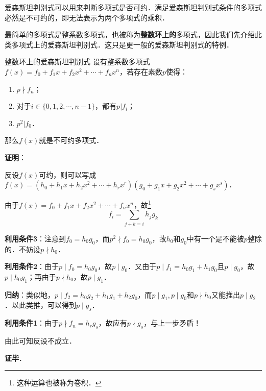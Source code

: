 
爱森斯坦判别式可以用来判断多项式是否可约．满足爱森斯坦判别式条件的多项式必然是不可约的，即无法表示为两个多项式的乘积．

最简单的多项式是整系数多项式，也被称为\textbf{整数环上的}多项式，因此我们先介绍此类多项式上的爱森斯坦判别式．这只是更一般的爱森斯坦判别式的特例．

\begin{theorem}{整数环上的爱森斯坦判别式}
设有整系数多项式$f(x)=f_0+f_1x+f_2x^2+\cdots+f_nx^n$，若存在素数$p$使得：
\begin{enumerate}
\item $p\nmid f_n$；
\item 对于$i\in\{0, 1, 2, \cdots, n-1\}$，都有$p|f_i$；
\item $p^2|f_0$．
\end{enumerate}
那么$f(x)$就是不可约多项式．
\end{theorem}

\textbf{证明}：

反设$f(x)$可约，则可以写成$f(x)=(h_0+h_1x+h_2x^2+\cdots+h_rx^r)(g_0+g_1x+g_2x^2+\cdots+g_sx^s)$．

由于$f(x)=f_0+f_1x+f_2x^2+\cdots+f_nx^n$，故\footnote{这种运算也被称为卷积．}\begin{equation}f_i=\sum\limits_{j+k=i}h_jg_k\end{equation}

\textbf{利用条件3}：注意到$f_0=h_0g_0$，而$p^2\nmid f_0=h_0g_0$，故$h_0$和$g_0$中有一个是不能被$p$整除的．不妨设$p\nmid h_0$．

\textbf{利用条件2}：由于$p\mid f_0=h_0g_0$，故$p\mid g_0$．又由于$p\mid f_1=h_0g_1+h_1g_0$且$p\mid g_0$，故$p\mid h_0g_1$；再由于$p\nmid h_0$，故$p\mid g_1$．

\textbf{归纳}：类似地，$p\mid f_2=h_0g_2+h_1g_1+h_2g_0$，而$p\mid g_1, p\mid g_0$和$p\nmid h_0$又能推出$p\mid g_2$．以此类推，可以得到$p\mid g_s$．

\textbf{利用条件1}：由于$p\nmid f_n=h_rg_s$，故应有$p\nmid g_s$，与上一步矛盾！

由此可知反设不成立．

\textbf{证毕}．







